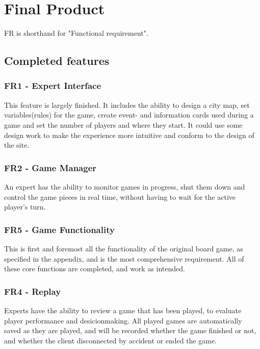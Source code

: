 \chapter{Final Product}

FR is shorthand for "Functional requirement".

\section{Completed features}

\subsection{FR1 - Expert Interface}
This feature is largely finished. It includes the ability to design a city map, set variables(rules) for the game, create event- and information cards used during a game and set the number of players and where they start. It could use some design work to make the experience more intuitive and conform to the design of the site.\\

\subsection{FR2 - Game Manager}
An expert has the ability to monitor games in progress, shut them down and control the game pieces in real time, without having to wait for the active player's turn.\\

\subsection{FR5 - Game Functionality}
This is first and foremost all the functionality of the original board game, as specified in the appendix, and is the most comprehensive requirement. All of these core functions are completed, and work as intended.\\

\subsection{FR4 - Replay}
Experts have the ability to review a game that has been played, to evaluate player performance and desicionmaking. All played games are automatically saved as they are played, and will be recorded whether the game finished or not, and whether the client disconnected by accident or ended the game.\\

